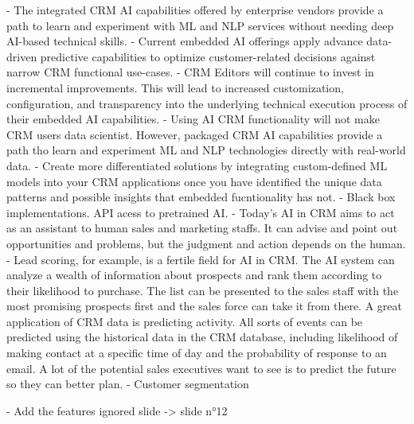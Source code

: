     - The integrated CRM AI capabilities offered by enterprise vendors provide a path to learn and experiment with ML and NLP services without needing deep AI-based technical skills.
    - Current embedded AI offerings apply advance data-driven predictive capabilities to optimize customer-related decisions against narrow CRM functional use-cases.
    - CRM Editors will continue to invest in incremental improvements. This will lead to increased customization, configuration, and transparency into the underlying technical execution process of their embedded AI capabilities.
    - Using AI CRM functionality will not make CRM users data scientist. However, packaged CRM AI capabilities provide a path tho learn and experiment ML and NLP technologies directly with real-world data.
    - Create more differentiated solutions by integrating custom-defined ML models into your CRM applications once you have identified the unique data patterns and possible insights that embedded fucntionality has not.
    - Black box implementations. API acess to pretrained AI.
    - Today’s AI in CRM aims to act as an assistant to human sales and marketing staffs. It can advise and point out opportunities and problems, but the judgment and action depends on the human.
    - Lead scoring, for example, is a fertile field for AI in CRM. The AI system can analyze a wealth of information about prospects and rank them according to their likelihood to purchase. The list can be presented to the sales staff with the most promising prospects first and the sales force can take it from there. A great application of CRM data is predicting activity. All sorts of events can be predicted using the historical data in the CRM database, including likelihood of making contact at a specific time of day and the probability of response to an email. A lot of the potential sales executives want to see is to predict the future so they can better plan.
    - Customer segmentation

    - Add the features ignored slide -> slide n°12